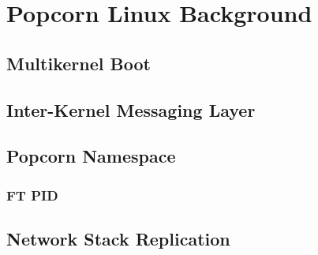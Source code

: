 \chapter{Popcorn Linux Background}
\section{Multikernel Boot}
\section{Inter-Kernel Messaging Layer}
\section{Popcorn Namespace}
\subsection{FT PID}
\section{Network Stack Replication}